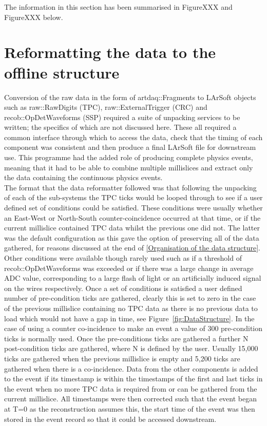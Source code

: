 The information in this section has been summarised in FigureXXX and FigureXXX below.

\section{Reformatting the data to the offline structure} \label{Reformatting the data to the offline structure} %
Conversion of the raw data in the form of artdaq::Fragments to LArSoft objects such as raw::RawDigits (TPC), raw::ExternalTrigger (CRC) and recob::OpDetWaveforms (SSP) required a suite of unpacking services to be written; the specifics of which are not discussed here. These all required a common interface through which to access the data, check that the timing of each component was consistent and then produce a final LArSoft file for downstream use. This programme had the added role of producing complete physics events, meaning that it had to be able to combine multiple millislices and extract only the data containing the continuous physics events. \\

The format that the data reformatter followed was that following the unpacking of each of the sub-systems the TPC ticks would be looped through to see if a user defined set of conditions could be satisfied. These conditions were usually whether an East-West or North-South counter-coincidence occurred at that time, or if the current millislice contained TPC data whilst the previous one did not. The latter was the default configuration as this gave the option of preserving all of the data gathered, for reasons discussed at the end of \ref{Organisation of the data structure}. Other conditions were available though rarely used such as if a threshold of recob::OpDetWaveforms was exceeded or if there was a large change in average ADC value, corresponding to a large flash of light or an artificially induced signal on the wires respectively. Once a set of conditions is satisfied a user defined number of pre-condition ticks are gathered, clearly this is set to zero in the case of the previous millislice containing no TPC data as there is no previous data to load which would not have a gap in time, see Figure~\ref{fig:DataStructure}. In the case of using a counter co-incidence to make an event a value of 300 pre-condition ticks is normally used. Once the pre-conditions ticks are gathered a further N post-condition ticks are gathered, where N is defined by the user. Usually 15,000 ticks are gathered when the previous millislice is empty and 5,200 ticks are gathered when there is a co-incidence. Data from the other components is added to the event if its timestamp is within the timestamps of the first and last ticks in the event when no more TPC data is required from or can be gathered from the current millislice. All timestamps were then corrected such that the event began at T=0 as the reconstruction assumes this, the start time of the event was then stored in the event record so that it could be accessed downstream. \\

